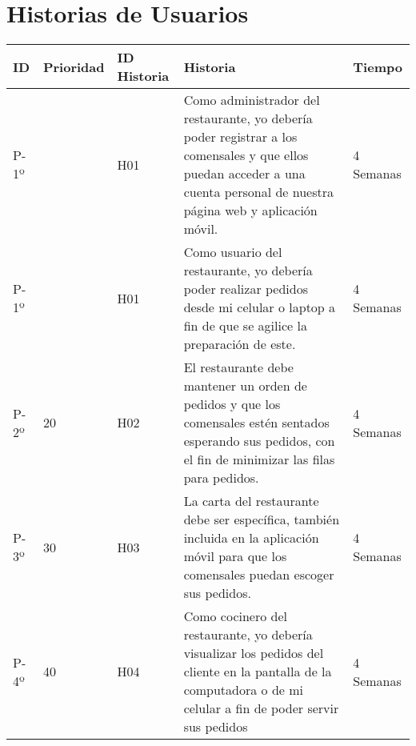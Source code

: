 \chapter{Historias de Usuarios}

\begin{table}[htbp]
	\begin{center}
		\begin{tabular}{| p{0.8cm}|p{2.0cm} | p{2.5 cm} | p{6.0cm}| p{2.0cm} |}
			\hline
			\centering\textbf{ID} & \textbf{Prioridad}& \textbf{ID Historia} & \textbf{Historia} & \textbf{Tiempo}
			
			\\\hline
			
			
			P-1º & \centering 10 & H01 &
			Como administrador del restaurante, yo debería poder registrar a los comensales y que ellos puedan acceder a una cuenta personal de nuestra página web y aplicación móvil.
			
			& 4 Semanas
			
			\\\hline
			P-1º & \centering 10 & H01 &
			Como usuario del restaurante, yo debería poder realizar pedidos desde mi celular o laptop a fin de que se agilice la preparación de este. 
			
			
			& 4 Semanas
			
			\\\hline
			P-2º & 20 & H02 &
			
			El restaurante debe mantener un orden de pedidos y que los comensales estén sentados esperando sus pedidos, con el fin de minimizar las filas para pedidos.
			
			& 4 Semanas
			
			\\\hline
			P-3º & 30 & H03 &
			
			La carta del restaurante debe ser específica, también incluida en la aplicación móvil para que los comensales puedan escoger sus pedidos.
			
			& 4 Semanas
			
			\\\hline
			P-4º & 40 & H04 & 
			
			Como cocinero del restaurante, yo debería visualizar los pedidos del cliente en la pantalla de la computadora o de mi celular a fin de poder servir sus pedidos
			
			& 4 Semanas \\\hline
		\end{tabular}
	\end{center}
\end{table}